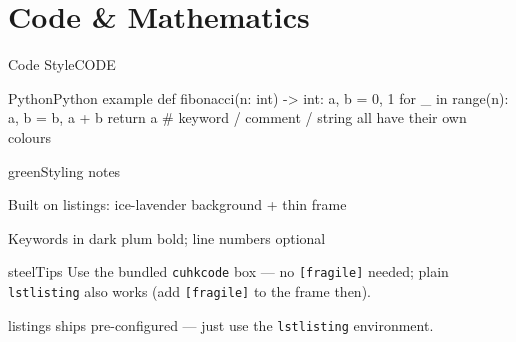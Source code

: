 \documentclass[10pt,aspectratio=169]{beamer}
\begin{document}
\section{Code \& Mathematics}

\begin{frame}[fragile]{Code Style}{CODE}
  \begin{cuhkcode}{Python}{Python example}
def fibonacci(n: int) -> int:
    a, b = 0, 1
    for _ in range(n):
        a, b = b, a + b
    return a
# keyword / comment / string all have their own colours
  \end{cuhkcode}
  \vspace{0.4mm}
  \begin{minipage}[t]{0.475\textwidth}
    \vspace{0pt}%
    \begin{cuhkbox}{green}{Styling notes}
      {\footnotesize
      \begin{denseitem}
        \item Built on listings: ice-lavender background + thin frame
        \item Keywords in dark plum bold; line numbers optional
      \end{denseitem}}
    \end{cuhkbox}
  \end{minipage}\hfill
  \begin{minipage}[t]{0.475\textwidth}
    \vspace{0pt}%
    \begin{cuhkbox}{steel}{Tips}
      {\footnotesize Use the bundled \texttt{cuhkcode} box ---
      no \texttt{[fragile]} needed; plain \texttt{lstlisting}
      also works (add \texttt{[fragile]} to the frame then).}
    \end{cuhkbox}
  \end{minipage}
  \begin{takeaway}
    listings ships pre-configured --- just use the \texttt{lstlisting} environment.
  \end{takeaway}
\end{frame}
\end{document}
